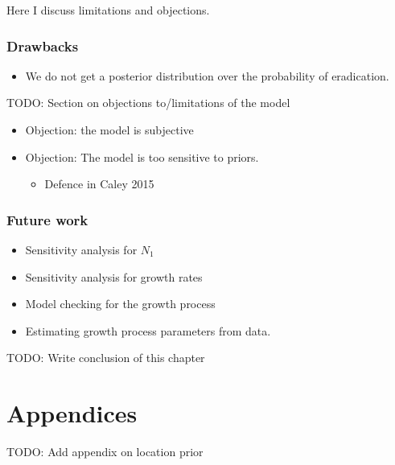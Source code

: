 \documentclass[
]{book}
\providecommand{\tightlist}{%
  \setlength{\itemsep}{0pt}\setlength{\parskip}{0pt}}
\begin{document}
Here I discuss limitations and objections.

\hypertarget{drawbacks}{%
\subsection{Drawbacks}\label{drawbacks}}

\begin{itemize}
\tightlist
\item
  We do not get a posterior distribution over the probability of eradication.
\end{itemize}

TODO: Section on objections to/limitations of the model

\begin{itemize}
\tightlist
\item
  Objection: the model is subjective
\item
  Objection: The model is too sensitive to priors.

  \begin{itemize}
  \tightlist
  \item
    Defence in Caley 2015
  \end{itemize}
\end{itemize}

\hypertarget{future-work}{%
\subsection{Future work}\label{future-work}}

\begin{itemize}
\tightlist
\item
  Sensitivity analysis for \(N_1\)
\item
  Sensitivity analysis for growth rates
\item
  Model checking for the growth process
\item
  Estimating growth process parameters from data.
\end{itemize}

TODO: Write conclusion of this chapter

\renewcommand{\baselinestretch}{1}\normalsize

\hypertarget{appendices}{%
\chapter{Appendices}\label{appendices}}

TODO: Add appendix on location prior
\end{document}
